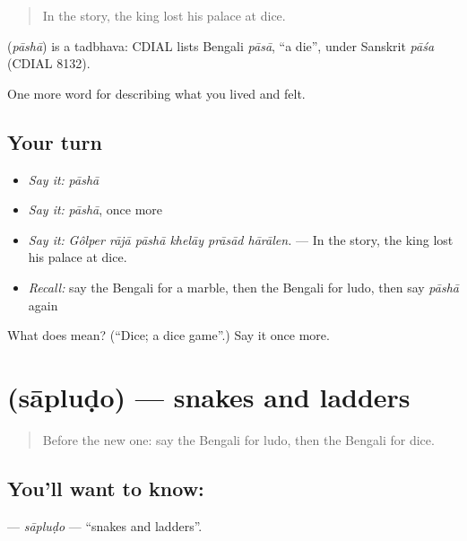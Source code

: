 \begin{quote}
In the story, the king lost his palace at dice.
\end{quote}

\begin{cousinweb}
\textbf{} (\emph{pāshā}) is a tadbhava: CDIAL lists Bengali \emph{pāsā}, \textquotedblleft{}a die\textquotedblright{}, under Sanskrit \emph{pāśa} (CDIAL 8132).
\end{cousinweb}

\begin{grammarlens}[title={What you've built}]
One more word for describing what you lived and felt.
\end{grammarlens}

\subsection*{Your turn}
\begin{itemize}
\raggedright
  \item \emph{Say it:} \emph{pāshā}
  \item \emph{Say it:} \emph{pāshā}, once more
  \item \emph{Say it:} \emph{Gôlper rājā pāshā khelāy prāsād hārālen.} — In the story, the king lost his palace at dice.
  \item \emph{Recall:} say the Bengali for a marble, then the Bengali for ludo, then say \emph{pāshā} again
\end{itemize}

\begin{tcolorbox}[breakable,colback=teal!4,colframe=teal!35!black,title={Before you move on}]
What does  mean? (\textquotedblleft{}Dice; a dice game\textquotedblright{}.) Say it once more.
\end{tcolorbox}
\section[\texorpdfstring{\bn{সাপলুডো} (sāpluḍo)}{সাপলুডো (sāpluḍo)}]{ (sāpluḍo) — snakes and ladders}

\label{lesson:BN-C518-sapludo}



\begin{quote}
Before the new one: say the Bengali for ludo, then the Bengali for dice.
\end{quote}

\subsection*{You'll want to know: }
\textbf{} — \emph{sāpluḍo} — \textquotedblleft{}snakes and ladders\textquotedblright{}.

